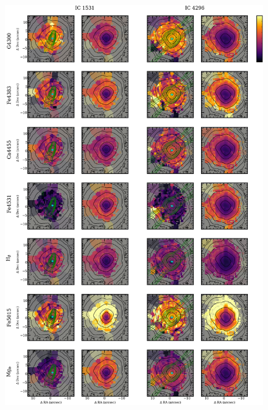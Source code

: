 		\begin{figure}
			\centering
			\includegraphics[height=0.94\textheight]{chapter4/vimos/abs2.png}
		\end{figure}
